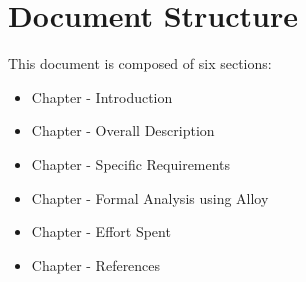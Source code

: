 \section{Document Structure}
\label{sec:document_structure}%
This document is composed of six sections:
\begin{itemize}
    \item{}  Chapter - Introduction
    \item{}  Chapter - Overall Description
    \item{}  Chapter - Specific Requirements
    \item{}  Chapter - Formal Analysis using Alloy
    \item{}  Chapter - Effort Spent
    \item{}  Chapter - References
\end{itemize}


    
         
